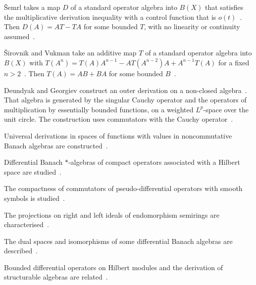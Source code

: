 \v{S}emrl takes a map $D$ of a standard operator algebra into $B(X)$ that
satisfies the multiplicative derivation inequality with a control function
that is $o(t)$~\cite{WlTheFunctionalEquationOfMultipl1994}. Then $D(A)=AT-TA$ for some bounded $T$, with no linearity or
continuity assumed~\cite{WlTheFunctionalEquationOfMultipl1994}.

\v{S}irovnik and Vukman take an additive map $T$ of a standard operator
algebra into $B(X)$ with
$T(A^n)=T(A)A^{n-1}-AT(A^{n-2})A+A^{n-1}T(A)$ for a fixed $n>2$~\cite{WlOnCertainFunctionalEquationRel2014}. Then
$T(A)=AB+BA$ for some bounded
$B$~\cite{WlOnCertainFunctionalEquationRel2014}.

Deundyak and Georgiev construct an outer derivation on a non-closed algebra~\cite{WlAnOuterDerivationConstructionO2020}.
That algebra is generated by the singular Cauchy operator and the operators of
multiplication by essentially bounded functions, on a weighted $L^p$-space
over the unit circle. The construction uses commutators with the Cauchy %
operator~\cite{WlAnOuterDerivationConstructionO2020}.

Universal derivations in spaces of functions with values in noncommutative
Banach algebras are constructed~\cite{WlUniversalDerivationsInSpacesOf2020}.

Differential Banach $*$-algebras of compact operators associated with a
Hilbert space are studied~\cite{WlDifferentialBanachAlgebrasOfCo2020}.

The compactness of commutators of pseudo-differential operators with smooth
symbols is studied~\cite{WlCompactnessOfCommutatorsOfPseu2020}.

The projections on right and left ideals of endomorphism semirings are
characterised~\cite{WlProjectionsOnRightAndLeftIdeal2020}.

The dual spaces and isomorphisms of some differential Banach algebras are
described~\cite{WlDualSpacesAndIsomorphismsOfSom2020}.

Bounded differential operators on Hilbert modules and the derivation of
structurable algebras are related~\cite{WlBoundedDifferentialOperatorsOn2020}.
